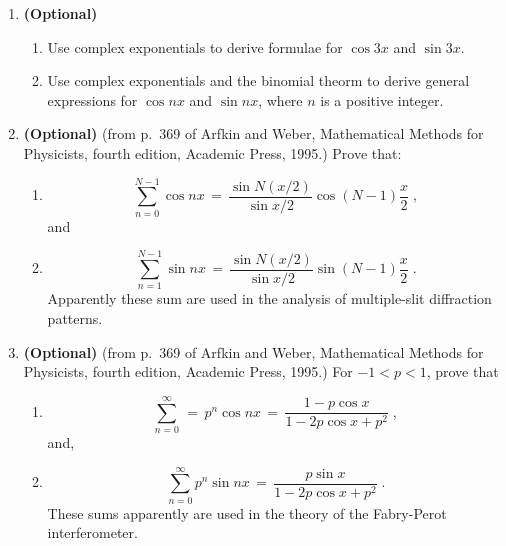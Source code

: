 \begin{enumerate}
\item  {\bf (Optional)} 
\begin{enumerate}
  \item Use complex exponentials to derive formulae for $\cos 3x$ and
  $\sin 3x$.
  \item Use complex exponentials and the binomial theorm to derive
  general expressions for $\cos nx$ and $\sin nx$, where $n$ is a
  positive integer.
\end{enumerate}

\item  {\bf (Optional)} (from p.~369 of Arfkin and Weber, Mathematical
Methods for Physicists, fourth edition, Academic Press, 1995.)  Prove
that:
\begin{enumerate}
\item 
\begin{equation}
\sum_{n=0}^{N-1} \cos nx \, = \, \frac{ \sin N(x/2)}{\sin x/2}
\cos(N-1)\frac{x}{2}\;, 
\end{equation}
and
\item
\begin{equation}
\sum_{n=1}^{N-1} \sin nx \, = \, \frac{\sin N(x/2)}{\sin x/2} \sin(N-1)
\frac{x}{2}\;. 
\end{equation}
\noindent Apparently these sum are used in the analysis of
multiple-slit diffraction patterns. 
\end{enumerate}

\item  {\bf (Optional)} (from p.~369 of Arfkin and Weber, Mathematical
Methods for Physicists, fourth edition, Academic Press, 1995.)
For $-1 < p < 1$, prove that
\begin{enumerate}
\item
\begin{equation}
  \sum_{n=0}^{\infty} \, = \, p^n \cos nx \, = \, \frac{ 1 - p \cos
  x}{ 1 - 2p \cos x + p^2} \;, 
\end{equation}
and,
\item
\begin{equation}
  \sum_{n=0}^\infty p^n \sin nx \, = \, \frac{ p \sin x}{1 - 2p\cos x
  + p^2} \;. 
\end{equation}
These sums apparently are used in the theory of the Fabry-Perot
interferometer.   
\end{enumerate}

\end{enumerate}

